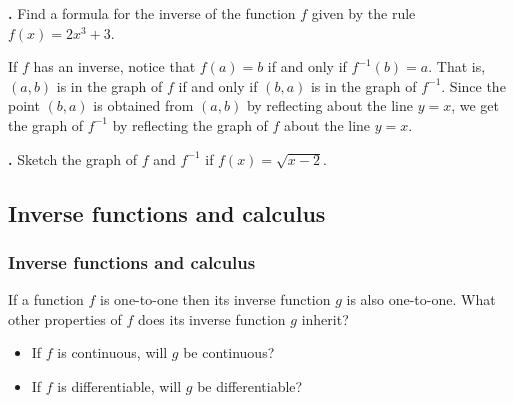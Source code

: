 \documentclass[t]{beamer}
\theoremstyle{plain}
\theoremstyle{definition}
\newcounter{heading}
\newcommand{\newhead}[1]{\medskip\stepcounter{heading}\noindent\textbf{\hspace{0.2cm}{#1}.}}
\begin{document}
\begin{frame}
\newhead{Example} Find a formula for the inverse of the function $f$ given by the rule $f(x) = 2x^{3} + 3$.

\vspace*{.8cm}\pause

\noindent If $f$ has an inverse, notice that $f(a) = b$ if and only if $f^{-1}(b) = a$.  That is, $(a,b)$ is in the graph of $f$ if and only if $(b,a)$ is in the graph of $f^{-1}$.  Since the point $(b,a)$ is obtained from $(a,b)$ by reflecting about the line $y=x$, we get the graph of $f^{-1}$ by reflecting the graph of $f$ about the line $y=x$.

\vspace*{.8cm}\pause

\newhead{Example} Sketch the graph of $f$ and $f^{-1}$ if $f(x) = \sqrt{x-2}$.
\end{frame}

\subsection{Inverse functions and calculus}
\begin{frame}
\frametitle{Inverse functions and calculus}

\noindent If a function $f$ is one-to-one then its inverse function $g$ is also one-to-one. What other properties of $f$ does its inverse function $g$ inherit?
\begin{itemize}[<+->]
\item If $f$ is continuous, will $g$ be continuous?
\item If $f$ is differentiable, will $g$ be differentiable?
\end{itemize}




\end{frame}
\end{document}
